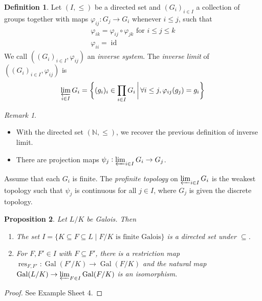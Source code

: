 \documentclass[11pt]{article}
\theoremstyle{definition}
\newtheorem{definition}{Definition}[subsection]
\theoremstyle{plain}
\newtheorem{proposition}[definition]{Proposition}
\theoremstyle{remark}
\newtheorem*{remark}{Remark}
\DeclareMathOperator{\Gal}{Gal}
\DeclareMathOperator{\res}{res}
\DeclareMathOperator{\id}{id}
\newcommand{\NN}{\mathbb{N}}
\begin{document}
\begin{definition}\label{def:16_2}
    Let $(I, \le)$ be a directed set and $(G_i)_{i \in I}$ a collection of groups together with maps $\varphi_{ij} : G_j \to G_i$ whenever $i \le j$, such that
    \begin{gather*}
        \varphi_{ik} = \varphi_{ij} \circ \varphi_{jk} \text{ for } i \le j \le k\\
        \varphi_{ii} = \id
    \end{gather*}
    We call $((G_i)_{i \in I}, \varphi_{ij})$ an \emph{inverse system}. The \emph{inverse limit} of $((G_i)_{i \in I}, \varphi_{ij})$ is
    \begin{equation*}
        \varprojlim_{i \in I} G_i = \bigg\{(g_i)_i \in \prod_{i \in I} G_i \,\bigg\vert\, \forall i \le j, \varphi_{ij}(g_j) = g_i\bigg\}
    \end{equation*}
\end{definition}

\begin{remark}\phantom{}
    \begin{itemize}
        \item With the directed set $(\NN, \le)$, we recover the previous definition of inverse limit.
        \item There are projection maps $\psi_j : \varprojlim_{i \in I} G_i \to G_j$.
    \end{itemize}
\end{remark}

Assume that each $G_i$ is finite. The \emph{profinite topology} on $\varprojlim_{i \in I} G_i$ is the weakest topology such that $\psi_j$ is continuous for all $j \in I$, where $G_j$ is given the discrete topology.

\begin{proposition}\label{prop:16_3}
    Let $L/K$ be Galois. Then
    \begin{enumerate}
        \item The set $I = \{K \subseteq F \subseteq L \mid F/K \text{ is finite Galois}\}$ is a directed set under $\subseteq$.
        \item For $F, F' \in I$ with $F \subseteq F'$, there is a restriction map $\res_{F,F'} : \Gal(F'/K) \to \Gal(F/K)$ and the natural map $\Gal(L/K) \to \varprojlim_{F \in I} \Gal(F/K)$ is an isomorphism.
    \end{enumerate}
\end{proposition}
\begin{proof}
    See Example Sheet 4.
\end{proof}
\end{document}
